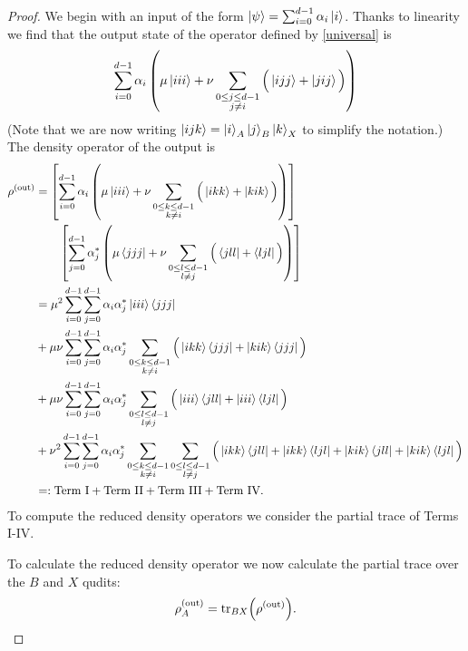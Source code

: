 \documentclass[reqno]{amsart}
\numberwithin{lemma}{section}
\numberwithin{proposition}{section}
\newcommand{\out}{\textnormal{out}}
\newcommand{\tr}{\textnormal{tr}}
\begin{document}
{\begin{proof}
We begin with an input of the form $\ket{\psi} = \sum_{i=0}^{d-1} \alpha_{i} \ket{i}$. Thanks to linearity we find that the output state of the operator defined by \eqref{universal} is 
\begin{equation*}
\sum_{i=0}^{d-1} \alpha_{i} \left ( \mu \ket{iii} + \nu \sum_{\substack{0 \leq j \leq d-1\\ j \neq i}} \Big ( \ket{ijj} + \ket{jij} \Big ) \right )
\end{equation*}
(Note that we are now writing $\ket{ijk} = \ket{i}_{A} \ket{j}_{B} \ket{k}_{X}$ to simplify the notation.) The density operator of the output is
\begin{align*}
\rho^{(\out)} &= \left [ \sum_{i=0}^{d-1} \alpha_{i} \left ( \mu \ket{iii} + \nu \sum_{\substack{0 \leq k \leq d-1\\ k \neq i}} \Big ( \ket{ikk} + \ket{kik} \Big ) \right ) \right ]\\
&\qquad \left [ \sum_{j=0}^{d-1} \alpha_{j}^{*} \left ( \mu \bra{jjj} + \nu \sum_{\substack{0 \leq l \leq d-1\\ l \neq j}} \Big ( \bra{jll} + \bra{ljl} \Big ) \right )\right ]\\
&= \mu^{2} \sum_{i=0}^{d-1} \sum_{j=0}^{d-1} \alpha_{i} \alpha_{j}^{*} \ket{iii} \bra{jjj} \\
& + \mu \nu \sum_{i=0}^{d-1} \sum_{j=0}^{d-1} \alpha_{i} \alpha_{j}^{*} \sum_{\substack{0 \leq k \leq d-1\\ k \neq i}} \Big ( \ket{ikk} \bra{jjj} + \ket{kik} \bra{jjj} \Big )\\
& + \mu \nu \sum_{i=0}^{d-1} \sum_{j=0}^{d-1} \alpha_{i} \alpha_{j}^{*} \sum_{\substack{0 \leq l \leq d-1\\ l \neq j}} \Big ( \ket{iii} \bra{jll} + \ket{iii} \bra{ljl} \Big )\\
& + \nu^{2} \sum_{i=0}^{d-1} \sum_{j=0}^{d-1} \alpha_{i} \alpha_{j}^{*} \sum_{\substack{0 \leq k \leq d-1\\ k \neq i}} \sum_{\substack{0 \leq l \leq d-1\\ l \neq j}} \Big ( \ket{ikk} \bra{jll} + \ket{ikk} \bra{ljl} + \ket{kik} \bra{jll} + \ket{kik} \bra{ljl} \Big )\\
&=: \text{Term I} + \text{Term II} + \text{Term III} + \text{Term IV}.
\end{align*}
To compute the reduced density operators we consider the partial trace of Terms I-IV.

\smallskip

\noindent{\textbf{Calculation of $\rho_{A}^{(\out)}$.}}
To calculate the reduced density operator we now calculate the partial trace over the $B$ and $X$ qudits:
\begin{equation*}
\rho_{A}^{(\out)} = \tr_{BX} \Big ( \rho^{(\out)} \Big ).
\end{equation*}


\end{proof}}
\end{document}
